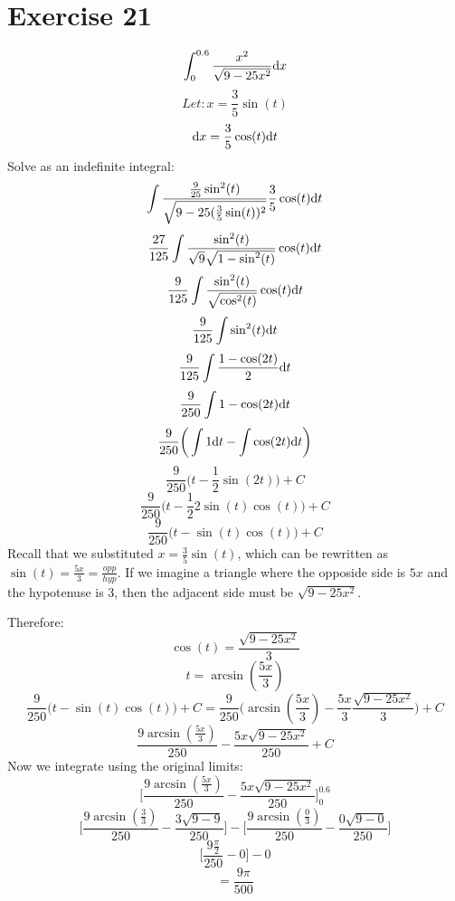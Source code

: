 \documentclass[letterpaper, 12pt]{math}
\begin{document}
\section*{Exercise 21}
\[ \int_{0}^{0.6}{\frac{x^{2}}{\sqrt{9-25x^{2}}}\mathrm{d}{x}} \]
\[ Let: x = \frac{3}{5}\sin(t) \]
\[ \mathrm{d}{x} = \frac{3}{5}\cos(t)\mathrm{d}{t} \]
Solve as an indefinite integral:
\[ \int{\frac{\frac{9}{25}\sin^{2}(t)}{\sqrt{9-25(\frac{3}{5}\sin(t))^{2}}}
   \frac{3}{5}\cos(t)\mathrm{d}{t}} \]
\[ \frac{27}{125}\int{\frac{\sin^{2}(t)}
   {\sqrt{9}\sqrt{1-\sin^{2}(t)}}\cos(t)\mathrm{d}{t}} \]
\[ \frac{9}{125}\int{\frac{\sin^{2}(t)}{\sqrt{\cos^{2}(t)}}\cos(t)\mathrm{d}{t}} \]
\[ \frac{9}{125}\int{\sin^{2}(t)\mathrm{d}{t}} \]
\[ \frac{9}{125}\int{\frac{1-\cos(2t)}{2}\mathrm{d}{t}} \]
\[ \frac{9}{250}\int{1-\cos(2t)\mathrm{d}{t}} \]
\[ \frac{9}{250}\bigg(\int{1\mathrm{d}{t}}-\int{\cos(2t)\mathrm{d}{t}}\bigg) \]
\[ \frac{9}{250}\bigg(t-\frac{1}{2}\sin(2t)\bigg)+C \]
\[ \frac{9}{250}\bigg(t-\frac{1}{2}2\sin(t)\cos(t)\bigg)+C \]
\[ \frac{9}{250}\bigg(t-\sin(t)\cos(t)\bigg)+C \]
Recall that we substituted \( x = \frac{3}{5}\sin(t) \), which can be rewritten
as \( \sin(t) = \frac{5x}{3} = \frac{opp}{hyp} \). If we imagine a triangle
where the opposide side is \( 5x \) and the hypotenuse is 3, then the adjacent
side must be \( \sqrt{9-25x^{2}} \).
\begin{center}
\end{center}
Therefore:
\[ \cos(t) = \frac{\sqrt{9-25x^{2}}}{3} \]
\[ t = \arcsin(\frac{5x}{3}) \]
\[ \frac{9}{250}\bigg(t-\sin(t)\cos(t)\bigg)+C =
   \frac{9}{250}\bigg(\arcsin(\frac{5x}{3})-
   \frac{5x}{3}\frac{\sqrt{9-25x^{2}}}{3}\bigg)+C \]
\[ \frac{9\arcsin(\frac{5x}{3})}{250}-\frac{5x\sqrt{9-25x^{2}}}{250}+C \]
Now we integrate using the original limits:
\[ \bigg[\frac{9\arcsin(\frac{5x}{3})}{250}-
   \frac{5x\sqrt{9-25x^{2}}}{250}\bigg]_{0}^{0.6} \]
\[ \bigg[\frac{9\arcsin(\frac{3}{3})}{250}-\frac{3\sqrt{9-9}}{250}\bigg]-
   \bigg[\frac{9\arcsin(\frac{0}{3})}{250}-\frac{0\sqrt{9-0}}{250}\bigg] \]
\[ \bigg[\frac{9\frac{\pi}{2}}{250}-0\bigg]-0 \]
\[ = \frac{9\pi}{500} \]
\end{document}
